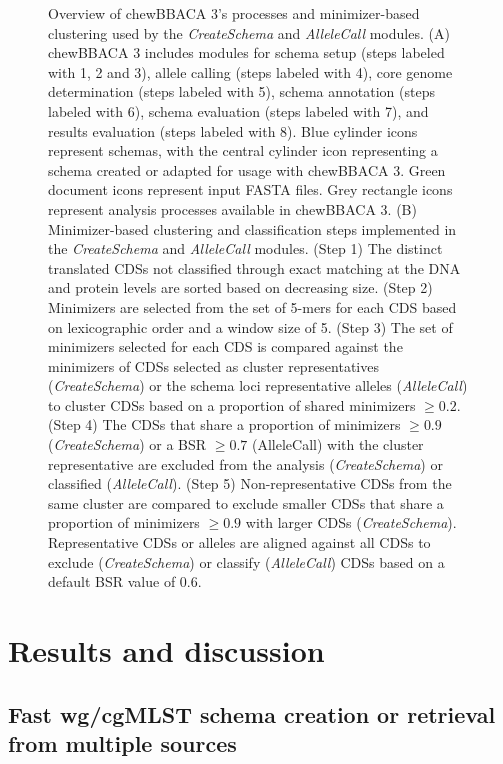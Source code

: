\begin{figure}[h!]
    \caption{Overview of chewBBACA 3’s processes and minimizer-based clustering used by the \textit{CreateSchema} and \textit{AlleleCall} modules. (A) chewBBACA 3 includes modules for schema setup (steps labeled with 1, 2 and 3), allele calling (steps labeled with 4), core genome determination (steps labeled with 5), schema annotation (steps labeled with 6), schema evaluation (steps labeled with 7), and results evaluation (steps labeled with 8). Blue cylinder icons represent schemas, with the central cylinder icon representing a schema created or adapted for usage with chewBBACA 3. Green document icons represent input FASTA files. Grey rectangle icons represent analysis processes available in chewBBACA 3. (B) Minimizer-based clustering and classification steps implemented in the \textit{CreateSchema} and \textit{AlleleCall} modules. (Step 1) The distinct translated \ac{CDSs} not classified through exact matching at the \ac{DNA} and protein levels are sorted based on decreasing size. (Step 2) Minimizers are selected from the set of 5-mers for each \ac{CDS} based on lexicographic order and a window size of 5. (Step 3) The set of minimizers selected for each \ac{CDS} is compared against the minimizers of \ac{CDSs} selected as cluster representatives (\textit{CreateSchema}) or the schema loci representative alleles (\textit{AlleleCall}) to cluster \ac{CDSs} based on a proportion of shared minimizers $\geq0.2$. (Step 4) The \ac{CDSs} that share a proportion of minimizers $\geq0.9$ (\textit{CreateSchema}) or a \ac{BSR} $\geq0.7$ (AlleleCall) with the cluster representative are excluded from the analysis (\textit{CreateSchema}) or classified (\textit{AlleleCall}). (Step 5) Non-representative \ac{CDSs} from the same cluster are compared to exclude smaller \ac{CDSs} that share a proportion of minimizers $\geq0.9$ with larger \ac{CDSs} (\textit{CreateSchema}). Representative \ac{CDSs} or alleles are aligned against all \ac{CDSs} to exclude (\textit{CreateSchema}) or classify (\textit{AlleleCall}) \ac{CDSs} based on a default \ac{BSR} value of 0.6.}\label{fig:chap2_figure1_legend}
\end{figure}

\section{Results and discussion} \label{sec:results_and_discussion}

\subsection{Fast wg/cgMLST schema creation or retrieval from multiple sources} \label{ssec:results_discussion_ssec1}

